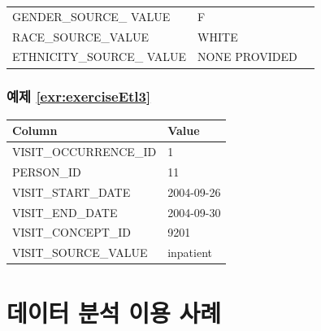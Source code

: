 \documentclass[11pt]{book}
\theoremstyle{definition}
\theoremstyle{definition}
\theoremstyle{definition}
\theoremstyle{remark}
\begin{document}
\begin{longtable}[]{@{}lll@{}}
\begin{minipage}[t]{0.23\columnwidth}
GENDER\_SOURCE\_ VALUE\strut
\end{minipage} & \begin{minipage}[t]{0.16\columnwidth}\raggedright\strut
F\strut
\end{minipage} & \begin{minipage}[t]{0.32\columnwidth}\raggedright\strut
\strut
\end{minipage}\tabularnewline
\begin{minipage}[t]{0.23\columnwidth}\raggedright\strut
RACE\_SOURCE\_VALUE\strut
\end{minipage} & \begin{minipage}[t]{0.16\columnwidth}\raggedright\strut
WHITE\strut
\end{minipage} & \begin{minipage}[t]{0.32\columnwidth}\raggedright\strut
\strut
\end{minipage}\tabularnewline
\begin{minipage}[t]{0.23\columnwidth}\raggedright\strut
ETHNICITY\_SOURCE\_ VALUE\strut
\end{minipage} & \begin{minipage}[t]{0.16\columnwidth}\raggedright\strut
NONE PROVIDED\strut
\end{minipage} & \begin{minipage}[t]{0.32\columnwidth}\raggedright\strut
\strut
\end{minipage}\tabularnewline
\bottomrule
\end{longtable}

\subsubsection*{예제 \ref{exr:exerciseEtl3}}\label{-refexrexerciseetl3}

\begin{longtable}[]{@{}ll@{}}
\toprule
Column & Value\tabularnewline
\midrule
\endhead
VISIT\_OCCURRENCE\_ID & 1\tabularnewline
PERSON\_ID & 11\tabularnewline
VISIT\_START\_DATE & 2004-09-26\tabularnewline
VISIT\_END\_DATE & 2004-09-30\tabularnewline
VISIT\_CONCEPT\_ID & 9201\tabularnewline
VISIT\_SOURCE\_VALUE & inpatient\tabularnewline
\bottomrule
\end{longtable}

\section{데이터 분석 이용 사례}\label{UseCasesanswers}
\end{document}
